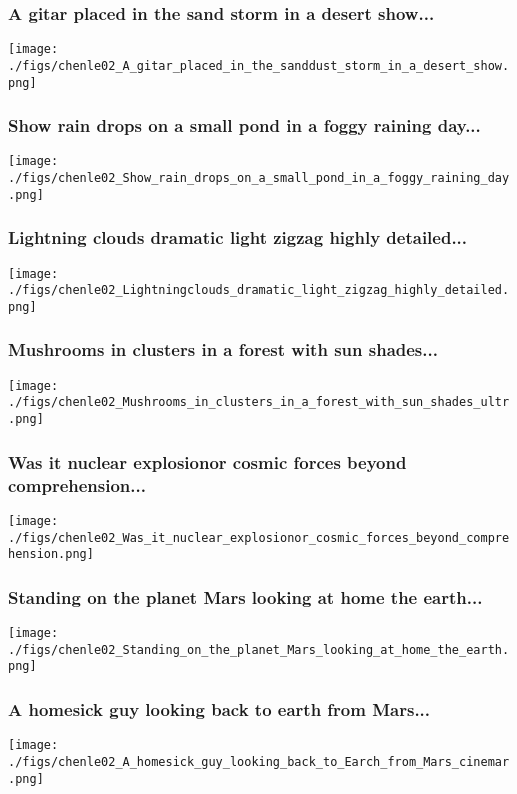 \documentclass[9pt,xcolor=dvipsnames,table]{beamer}
\begin{document}
\begin{frame}[fragile,t] %
  \frametitle{A gitar placed in the sand storm in a desert show...}
  \begin{center}
    \texttt{[image: ./figs/chenle02\_A\_gitar\_placed\_in\_the\_sanddust\_storm\_in\_a\_desert\_show.png]}
  \end{center}
\end{frame}
\begin{frame}[fragile,t] %
  \frametitle{Show rain drops on a small pond in a foggy raining day...}
  \begin{center}
    \texttt{[image: ./figs/chenle02\_Show\_rain\_drops\_on\_a\_small\_pond\_in\_a\_foggy\_raining\_day.png]}
  \end{center}
\end{frame}
\begin{frame}[fragile,t] %
  \frametitle{Lightning clouds dramatic light zigzag highly detailed...}
  \begin{center}
    \texttt{[image: ./figs/chenle02\_Lightningclouds\_dramatic\_light\_zigzag\_highly\_detailed.png]}
  \end{center}
\end{frame}
\begin{frame}[fragile,t] %
  \frametitle{Mushrooms in clusters in a forest with sun shades...}
  \begin{center}
    \texttt{[image: ./figs/chenle02\_Mushrooms\_in\_clusters\_in\_a\_forest\_with\_sun\_shades\_ultr.png]}
  \end{center}
\end{frame}
\begin{frame}[fragile,t] %
  \frametitle{Was it nuclear explosionor cosmic forces beyond comprehension...}
  \begin{center}
    \texttt{[image: ./figs/chenle02\_Was\_it\_nuclear\_explosionor\_cosmic\_forces\_beyond\_comprehension.png]}
  \end{center}
\end{frame}
\begin{frame}[fragile,t] %
  \frametitle{Standing on the planet Mars looking at home the earth...}
  \begin{center}
    \texttt{[image: ./figs/chenle02\_Standing\_on\_the\_planet\_Mars\_looking\_at\_home\_the\_earth.png]}
  \end{center}
\end{frame}
\begin{frame}[fragile,t] %
  \frametitle{A homesick guy looking back to earth from Mars...}
  \begin{center}
    \texttt{[image: ./figs/chenle02\_A\_homesick\_guy\_looking\_back\_to\_Earch\_from\_Mars\_cinemar.png]}
  \end{center}
\end{frame}
\end{document}
